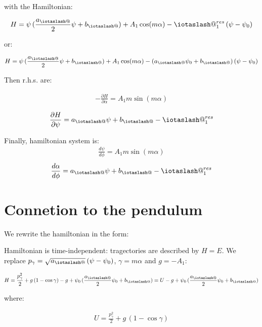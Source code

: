 \documentclass[11pt,a4paper,oneside]{article}
\makeatletter
\newcommand{\iotaslash}{{\mathpalette\iotaslash@\relax}}
\newcommand{\iotaslash@}[2]{
  \raisebox{-0.6\height}[0pt][0pt]{%
    \rotatebox[origin=Bl]{15}{$\m@th#1{\mkern-1mu\mathchar'26}$}%
  }%
  \mkern-9.5mu\nonscript\mkern-1mu
  \iota
  \mkern1mu
}
\makeatother
\begin{document}
with the Hamiltonian:

\begin{align}
H=\psi\,(\frac{a_\iotaslash}{2}\psi+b_\iotaslash)+A_1\cos(m\alpha)-\iotaslash^{res}_1\,(\psi-\psi_0)
\end{align}

or:

\begin{align}
H=\psi\,(\frac{a_\iotaslash}{2}\psi+b_\iotaslash)+A_1\cos(m\alpha)-(a_\iotaslash\psi_0+b_\iotaslash)\,(\psi-\psi_0)
\end{align}

Then r.h.s. are:

\begin{align}
-\frac{\partial H}{\partial\alpha}=A_1m\sin(m\alpha)
\end{align}

\begin{align}
\frac{\partial H}{\partial\psi}=a_\iotaslash\psi+b_\iotaslash-\iotaslash^{res}_1
\end{align}

Finally, hamiltonian system is:
\begin{align}\label{eq:ham_td_1}
\frac{d \psi}{d\phi}=A_1m\sin(m\alpha)
\end{align}
\begin{align}\label{eq:ham_td_2}
\frac{d \alpha}{d\phi}=a_\iotaslash\psi+b_\iotaslash-\iotaslash^{res}_1
\end{align}

\section{Connetion to the pendulum}

We rewrite the hamiltonian in the form:



Hamiltonian is time-independent: tragectories are described by $H=E$. We replace $p_\gamma=\sqrt{a_\iotaslash}\,(\psi-\psi_0)$, $\gamma=m\alpha$ and $g=-A_1$:

\begin{align}
H=\frac{p_\gamma^2}{2}+g\,(1-\cos\gamma)-g+\psi_0\,(\frac{a_\iotaslash}{2}\psi_0+b_\iotaslash)=U-g+\psi_0\,(\frac{a_\iotaslash}{2}\psi_0+b_\iotaslash)
\end{align}

where:

\begin{align}
U=\frac{p_\gamma^2}{2}+g\,(1-\cos\gamma)
\end{align}
\end{document}
